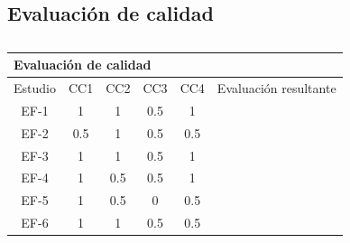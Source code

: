 \documentclass[conference,onecolumn,10pt]{IEEEtran}
\begin{document}
\subsection{Evaluación de calidad}

\begin{table}[]
        \caption{}
        \label{tab:my-table}
        \centering 
        \begin{tabular}{|c|c|c|c|c|l|l|}
                \hline
                \multicolumn{7}{|l|}{Evaluación de calidad}                                                                                                                                               \\ \hline
                \multicolumn{1}{|l|}{Estudio} & \multicolumn{1}{l|}{CC1} & \multicolumn{1}{l|}{CC2} & \multicolumn{1}{l|}{CC3} & \multicolumn{1}{l|}{CC4} & \multicolumn{2}{l|}{Evaluación resultante}    \\ \hline
                \rowcolor[HTML]{FFFFFF} 
                EF-1                          & 1                        & 1                        & 0.5                      & 1                        & \multicolumn{2}{l|}{\cellcolor[HTML]{FFFFFF}} \\ \hline
                \rowcolor[HTML]{FFFFFF} 
                EF-2                          & 0.5                      & 1                        & 0.5                      & 0.5                      & \multicolumn{2}{l|}{\cellcolor[HTML]{FFFFFF}} \\ \hline
                \rowcolor[HTML]{FFFFFF} 
                EF-3                          & 1                        & 1                        & 0.5                      & 1                        & \multicolumn{2}{l|}{\cellcolor[HTML]{FFFFFF}} \\ \hline
                \rowcolor[HTML]{FFFFFF} 
                EF-4                          & 1                        & 0.5                      & 0.5                      & 1                        & \multicolumn{2}{l|}{\cellcolor[HTML]{FFFFFF}} \\ \hline
                \rowcolor[HTML]{FFFFFF} 
                EF-5                          & 1                        & 0.5                      & 0                        & 0.5                      & \multicolumn{2}{l|}{\cellcolor[HTML]{FFFFFF}} \\ \hline
                \rowcolor[HTML]{FFFFFF} 
                EF-6                          & 1                        & 1                        & 0.5                      & 0.5                      & \multicolumn{2}{l|}{\cellcolor[HTML]{FFFFFF}} \\ \hline

\end{tabular}
\end{table}
\end{document}
